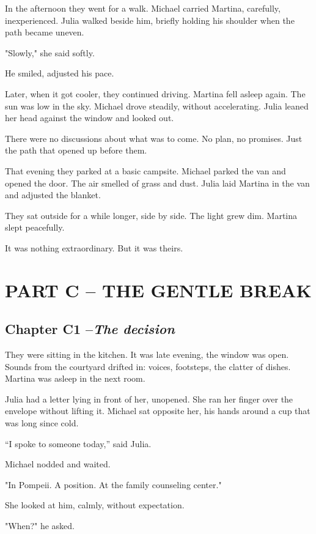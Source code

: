 \documentclass[
]{article}
\begin{document}
In the afternoon they went for a walk. Michael carried Martina, carefully, inexperienced. Julia walked beside him, briefly holding his shoulder when the path became uneven.

"Slowly," she said softly.

He smiled, adjusted his pace.

Later, when it got cooler, they continued driving. Martina fell asleep again. The sun was low in the sky. Michael drove steadily, without accelerating. Julia leaned her head against the window and looked out.

There were no discussions about what was to come. No plan, no promises. Just the path that opened up before them.

That evening they parked at a basic campsite. Michael parked the van and opened the door. The air smelled of grass and dust. Julia laid Martina in the van and adjusted the blanket.

They sat outside for a while longer, side by side. The light grew dim. Martina slept peacefully.

It was nothing extraordinary. But it was theirs.

\section{PART C -- THE GENTLE BREAK}\label{part-c-the-gentle-break}

\subsection{\texorpdfstring{Chapter C1 --\emph{The decision}}{Chapter C1 --The decision}}\label{chapter-c1-the-decision}

They were sitting in the kitchen. It was late evening, the window was open. Sounds from the courtyard drifted in: voices, footsteps, the clatter of dishes. Martina was asleep in the next room.

Julia had a letter lying in front of her, unopened. She ran her finger over the envelope without lifting it. Michael sat opposite her, his hands around a cup that was long since cold.

``I spoke to someone today,'' said Julia.

Michael nodded and waited.

"In Pompeii. A position. At the family counseling center."

She looked at him, calmly, without expectation.

"When?" he asked.
\end{document}
